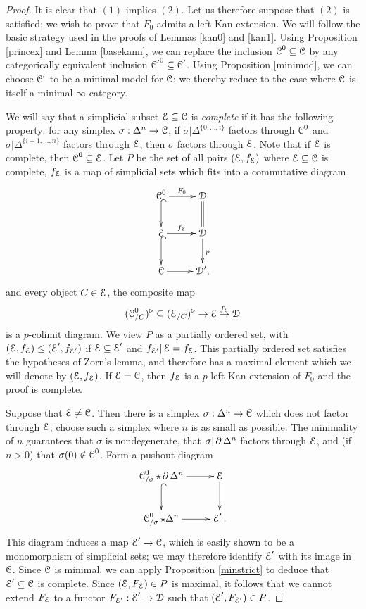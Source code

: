 \begin{proof}
It is clear that $(1)$ implies $(2)$. Let us therefore suppose that $(2)$ is satisfied; we wish to prove that $F_0$ admits a left Kan extension. We will follow the basic strategy used in the proofs
of Lemmas \ref{kan0} and \ref{kan1}. 
Using Proposition \ref{princex} and Lemma \ref{basekann}, we can replace the inclusion $\operatorname{\mathcal{C}}^{0} \subseteq \operatorname{\mathcal{C}}$ by any categorically equivalent inclusion
${\operatorname{\mathcal{C}}'}^{0} \subseteq \operatorname{\mathcal{C}}'$. Using Proposition \ref{minimod}, we can choose
$\operatorname{\mathcal{C}}'$ to be a minimal model for $\operatorname{\mathcal{C}}$; we thereby reduce to the case where
$\operatorname{\mathcal{C}}$ is itself a minimal $\infty$-category.

We will say that a simplicial subset $\operatorname{\mathcal{E}} \subseteq \operatorname{\mathcal{C}}$ is {\it complete} if it has the following property:
for any simplex $\sigma: \Delta^n \rightarrow \operatorname{\mathcal{C}}$, if $\sigma| \Delta^{ \{0, \ldots, i\} }$ factors through $\operatorname{\mathcal{C}}^{0}$ and $\sigma| \Delta^{ \{i+1, \ldots, n \} }$ factors through $\operatorname{\mathcal{E}}$, then $\sigma$
factors through $\operatorname{\mathcal{E}}$. Note that if $\operatorname{\mathcal{E}}$ is complete, then $\operatorname{\mathcal{C}}^{0} \subseteq \operatorname{\mathcal{E}}$.
Let $P$ be the set of all pairs $(\operatorname{\mathcal{E}}, f_{\operatorname{\mathcal{E}}})$ where $\operatorname{\mathcal{E}} \subseteq \operatorname{\mathcal{C}}$ is complete, $f_{\operatorname{\mathcal{E}}}$ is a map of simplicial
sets which fits into a commutative diagram
$$ \xymatrix{ \calC^{0} \ar@{^{(}->}[d] \ar[r]^{F_0} & \calD \ar@{=}[d] \\
\calE \ar[r] \ar@{^{(}->}[d] \ar[r]^{f_{\calE}} & \calD \ar[d]^{p} \\
\calC \ar[r] & \calD', }$$
and every object $C \in \operatorname{\mathcal{E}}$, the composite map
$$ (\operatorname{\mathcal{C}}^{0}_{/C})^{\triangleright} \subseteq (\operatorname{\mathcal{E}}_{/C})^{\triangleright} \rightarrow \operatorname{\mathcal{E}} \stackrel{f_{\operatorname{\mathcal{E}}}}{\rightarrow} \operatorname{\mathcal{D}}$$
is a $p$-colimit diagram. We view $P$ as a partially ordered set, with
$(\operatorname{\mathcal{E}}, f_{\operatorname{\mathcal{E}}}) \leq (\operatorname{\mathcal{E}}', f_{\operatorname{\mathcal{E}}'})$ if $\operatorname{\mathcal{E}} \subseteq \operatorname{\mathcal{E}}'$ and
$f_{\operatorname{\mathcal{E}}'}|\operatorname{\mathcal{E}} = f_{\operatorname{\mathcal{E}}}$. This partially ordered set satisfies the hypotheses of Zorn's lemma,
and therefore has a maximal element which we will denote by $(\operatorname{\mathcal{E}}, f_{\operatorname{\mathcal{E}}})$. If
$\operatorname{\mathcal{E}} = \operatorname{\mathcal{C}}$, then $f_{\operatorname{\mathcal{E}}}$ is a $p$-left Kan extension of $F_0$ and the proof is complete.

Suppose that $\operatorname{\mathcal{E}} \neq \operatorname{\mathcal{C}}$. Then there is a simplex $\sigma: \Delta^n \rightarrow \operatorname{\mathcal{C}}$
which does not factor through $\operatorname{\mathcal{E}}$; choose such a simplex where $n$ is as small as possible.
The minimality of $n$ guarantees that $\sigma$ is nondegenerate, that $\sigma | \operatorname{\partial} \Delta^n$ factors through $\operatorname{\mathcal{E}}$, and (if $n > 0$) that $\sigma(0) \notin \operatorname{\mathcal{C}}^{0}$. Form
a pushout diagram
$$ \xymatrix{ \calC^0_{/ \sigma} \star \bd \Delta^n \ar[r] \ar@{^{(}->}[d] & \calE \ar[d] \\
\calC^{0}_{/\sigma} \star \Delta^n \ar[r] & \calE'. }$$
This diagram induces a map $\operatorname{\mathcal{E}}' \rightarrow \operatorname{\mathcal{C}}$, which is easily shown to be a monomorphism of simplicial sets; we may therefore identify $\operatorname{\mathcal{E}}'$ with its image in $\operatorname{\mathcal{C}}$.
Since $\operatorname{\mathcal{C}}$ is minimal, we can apply Proposition \ref{minstrict} to deduce that $\operatorname{\mathcal{E}}' \subseteq \operatorname{\mathcal{C}}$ is complete. Since $(\operatorname{\mathcal{E}}, F_{\operatorname{\mathcal{E}}}) \in P$ is maximal, it follows that we cannot extend
$F_{\operatorname{\mathcal{E}}}$ to a functor $F_{\operatorname{\mathcal{E}}'}: \operatorname{\mathcal{E}}' \rightarrow \operatorname{\mathcal{D}}$ such that $(\operatorname{\mathcal{E}}', F_{\operatorname{\mathcal{E}}'}) \in P$.


\end{proof}
